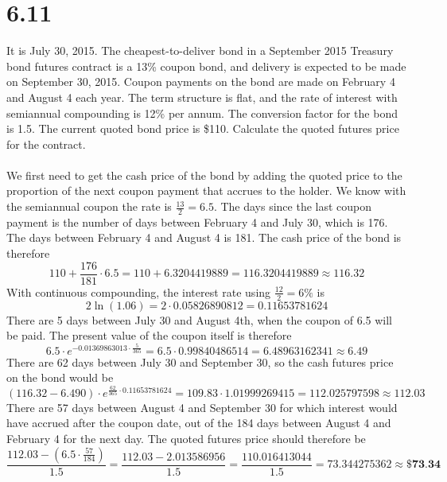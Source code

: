 \documentclass{article}
\begin{document}
{\Large 

\section*{6.11}
It is July 30, 2015. The cheapest-to-deliver bond in a September 2015 Treasury bond futures contract is a 13\% coupon bond, and delivery is expected to be made on September 30, 2015. Coupon payments on the bond are made on February 4 and August 4 each year. The term structure is flat, and the rate of interest with semiannual compounding is 12\% per annum. The conversion factor for the bond is 1.5. The current quoted bond price is \$110. Calculate the quoted futures price for the contract. \\ \\ 
We first need to get the cash price of the bond by adding the quoted price to the proportion of the next coupon payment that accrues to the holder. We know with the semiannual coupon the rate is \(\frac{13}{2} = 6.5\). The days since the last coupon payment is the number of days between February 4 and July 30, which is 176. The days between February 4 and August 4 is 181. The cash price of the bond is therefore 
\[
  110 + \frac{176}{181} \cdot 6.5 = 110 + 6.3204419889 = 116.3204419889 \approx 116.32
\]
With continuous compounding, the interest rate using \(\frac{12}{2} = 6\%\) is 
\[
  2 \ln(1.06) = 2 \cdot 0.05826890812 = 0.11653781624
\]
There are 5 days between July 30 and August 4th, when the coupon of 6.5 will be paid. The present value of the coupon itself is therefore 
\[
  6.5 \cdot e^{-0.01369863013 \cdot \frac{5}{365}} = 6.5 \cdot 0.99840486514 =  6.48963162341 \approx 6.49
\]
There are 62 days between July 30 and September 30, so the cash futures price on the bond would be 
\[
  (116.32 - 6.490) \cdot e^{\frac{62}{365} \cdot 0.11653781624} = 109.83 \cdot 1.01999269415 = 112.025797598 \approx 112.03
\]
There are 57 days between August 4 and September 30 for which interest would have accrued after the coupon date, out of the 184 days between August 4 and February 4 for the next day. The quoted futures price should therefore be 
\[
  \frac{112.03 - (6.5 \cdot \frac{57}{184})}{1.5} = \frac{112.03 - 2.013586956}{1.5} = \frac{110.016413044}{1.5} = 73.344275362 \approx \boxed{\textbf{\$73.34}}
\]

}
\end{document}
